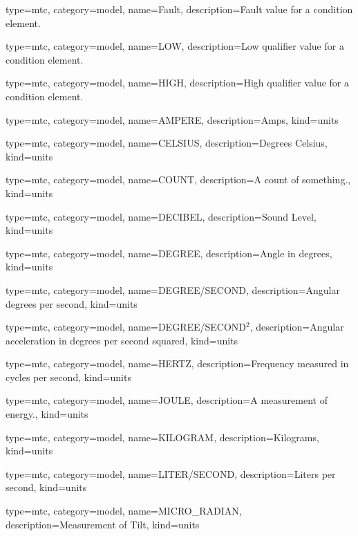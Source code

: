 {
  type=mtc,
  category=model,
  name={Fault},
  description={Fault value for a \gls{condition} element.}
}


{
  type=mtc,
  category=model,
  name={LOW},
  description={Low \gls{qualifier} value for a \gls{condition} element.}
}


{
  type=mtc,
  category=model,
  name={HIGH},
  description={High \gls{qualifier} value for a \gls{condition} element.}
}


{
  type=mtc,
  category=model,
  name={AMPERE},
  description={Amps},
  kind={units}
}


{
  type=mtc,
  category=model,
  name={CELSIUS},
  description={Degrees Celsius},
  kind={units}
}


{
  type=mtc,
  category=model,
  name={COUNT},
  description={A count of something.},
  kind={units}
}


{
  type=mtc,
  category=model,
  name={DECIBEL},
  description={Sound Level},
  kind={units}
}


{
  type=mtc,
  category=model,
  name={DEGREE},
  description={Angle in degrees},
  kind={units}
}


{
  type=mtc,
  category=model,
  name={DEGREE/SECOND},
  description={Angular degrees per second},
  kind={units}
}


{
  type=mtc,
  category=model,
  name={DEGREE/SECOND$^2$},
  description={Angular acceleration in degrees per second squared},
  kind={units}
}


{
  type=mtc,
  category=model,
  name={HERTZ},
  description={Frequency measured in cycles per second},
  kind={units}
}


{
  type=mtc,
  category=model,
  name={JOULE},
  description={A measurement of energy.},
  kind={units}
}


{
  type=mtc,
  category=model,
  name={KILOGRAM},
  description={Kilograms},
  kind={units}
}



{
  type=mtc,
  category=model,
  name={LITER/SECOND},
  description={Liters per second},
  kind={units}
}


{
  type=mtc,
  category=model,
  name={MICRO\_RADIAN},
  description={Measurement of Tilt},
  kind={units}
}


